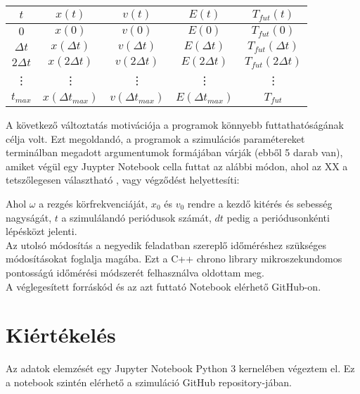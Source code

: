 \begin{multicols}{2}
\begin{center}
\begin{tabular}{c|c|c|c|c}
$t$ & $x \left( t \right)$ & $v \left( t \right)$ & $E \left( t \right)$ & $T_{fut} \left( t \right)$ \\
\hline \hline
$0$ & $x \left( 0 \right)$ & $v \left( 0 \right)$  & $E \left( 0 \right)$ & $T_{fut} \left( 0 \right)$ \\
\hline
$\Delta t$ & $x \left( \Delta t \right)$ & $v \left( \Delta t \right)$ & $E \left( \Delta t \right)$ & $T_{fut} \left( \Delta t \right)$ \\
\hline
$2 \Delta t$ & $x \left( 2 \Delta t \right)$ & $v \left( 2 \Delta t \right)$ & $E \left( 2 \Delta t \right)$ & $T_{fut} \left( 2 \Delta t \right)$ \\
\hline
\vdots & \vdots & \vdots & \vdots & \vdots \\
\hline
$t_{max}$ & $x \left( \Delta t_{max} \right)$ & $v \left( \Delta t_{max} \right)$ & $E \left( \Delta t_{max} \right)$ &$T_{fut}$ \\
\hline
\end{tabular}
\end{center}
\label{tab1}
\hfill \break \hfill \break
\noindent A következő változtatás motivációja a programok könnyebb futtathatóságának célja volt. Ezt megoldandó, a programok a szimulációs paramétereket terminálban megadott argumentumok formájában várják (ebből 5 darab van), amiket végül egy Juypter Notebook cella futtat az alábbi módon, ahol az XX a tetszőlegesen választható , vagy  végződést helyettesíti:
\begin{center}
\end{center}
Ahol $\omega$ a rezgés körfrekvenciáját, $x_{0}$ és $v_{0}$ rendre a kezdő kitérés és sebesség nagyságát, $t$ a szimulálandó periódusok számát, $dt$ pedig a periódusonkénti lépésközt jelenti. \\
Az utolsó módosítás a negyedik feladatban szereplő időméréshez szükséges módosításokat foglalja magába. Ezt a C++ chrono library mikroszekundomos pontosságú időmérési módszerét felhasználva oldottam meg. \\
A véglegesített forráskód és az azt futtató Notebook elérhető GitHub-on\cite{github}.

\section{Kiértékelés}
Az adatok elemzését egy Jupyter Notebook Python 3 kernelében végeztem el. Ez a notebook szintén elérhető a szimuláció GitHub repository-jában\cite{github}.


\end{multicols}
